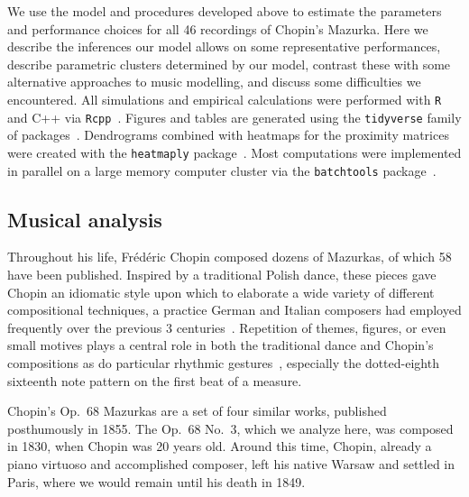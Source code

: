 \documentclass[aoas]{imsart}
\begin{document}
We use the model and procedures developed above to estimate the
parameters and performance choices for all 46 recordings of Chopin's
Mazurka. Here we describe the inferences our model allows on some
representative performances, describe parametric clusters determined
by our model, contrast these with some alternative approaches to music
modelling, and discuss some difficulties we encountered. All simulations and empirical calculations were performed with
\texttt{R}~\citep{R-Core-Team2019} and C++ via \texttt{Rcpp}~\citep{Eddelbuettel2013}. Figures and tables are generated
using the \texttt{tidyverse} family of
packages~\citep{Wickham2017, Wickham2016}. Dendrograms combined with
heatmaps for the proximity matrices were created with the
\texttt{heatmaply} package~\citep{GaliliOCallaghan2017}.
Most
computations were implemented in parallel on a
large
memory computer cluster via
the \texttt{batchtools} package~\citep{LangBischl2017}. 

\subsection{Musical analysis}
\label{sec:musical-analysis}

Throughout his life, Fr\'ed\'eric Chopin composed dozens of Mazurkas,
of which 58 have been published. Inspired by a traditional Polish
dance, these pieces gave Chopin an idiomatic style upon which to
elaborate a wide variety of different compositional techniques, a
practice German and Italian composers had employed frequently over the previous 3
centuries~\citep{BurkholderGrout2014}. Repetition of themes, figures, or even small motives plays
a central role in both the traditional dance and Chopin's compositions
as do particular rhythmic gestures~\citep{Kallberg1996}, especially the
dotted-eighth sixteenth note pattern on the first beat of a measure. 

Chopin's Op.\ 68 Mazurkas are a set of four similar works, published
posthumously in 1855. The Op.\ 68 No.\ 3, which we analyze here, was
composed in 1830, when Chopin was 20 years old. Around this time,
Chopin, already a piano virtuoso and accomplished composer, left his
native Warsaw and settled in Paris, where we would remain until his
death in 1849.
\end{document}
